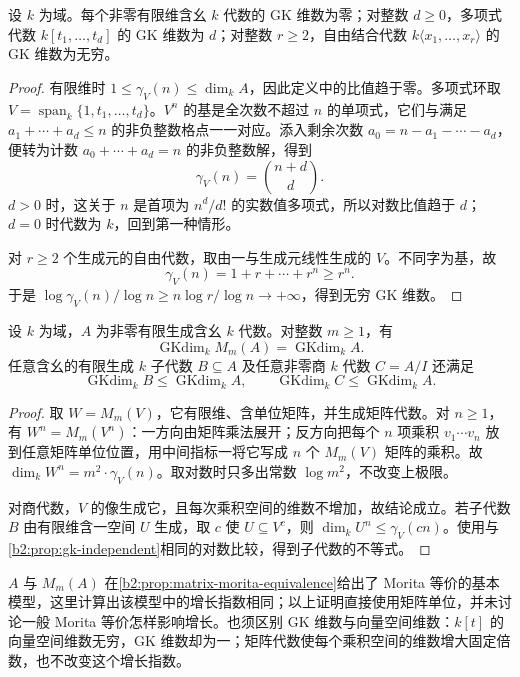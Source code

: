 \begin{proposition}\label{b2:prop:gk-basic-examples}
	设 \(k\) 为域。每个非零有限维含幺 \(k\) 代数的 GK 维数为零；对整数 \(d\geq0\)，多项式代数 \(k[t_1,\ldots,t_d]\) 的 GK 维数为 \(d\)；对整数 \(r\geq2\)，自由结合代数 \(k\langle x_1,\ldots,x_r\rangle\) 的 GK 维数为无穷。
\end{proposition}
\begin{proof}
	有限维时 \(1\le\gamma_V(n)\le\dim_kA\)，因此定义中的比值趋于零。多项式环取 \(V=\operatorname{span}_k\{1,t_1,\ldots,t_d\}\)。\(V^n\) 的基是全次数不超过 \(n\) 的单项式，它们与满足 \(a_1+\cdots+a_d\le n\) 的非负整数格点一一对应。添入剩余次数 \(a_0=n-a_1-\cdots-a_d\)，便转为计数 \(a_0+\cdots+a_d=n\) 的非负整数解，得到
	\[
		\gamma_V(n)=\binom{n+d}{d}.
	\]
	\(d>0\) 时，这关于 \(n\) 是首项为 \(n^d/d!\) 的实数值多项式，所以对数比值趋于 \(d\)；\(d=0\) 时代数为 \(k\)，回到第一种情形。

	对 \(r\ge2\) 个生成元的自由代数，取由一与生成元线性生成的 \(V\)。不同字为基，故
	\[
		\gamma_V(n)=1+r+\cdots+r^n\ge r^n.
	\]
	于是 \(\log\gamma_V(n)/\log n\ge n\log r/\log n\rightarrow+\infty\)，得到无穷 GK 维数。
\end{proof}

\begin{proposition}\label{b2:prop:gk-matrix-quotient}
	设 \(k\) 为域，\(A\) 为非零有限生成含幺 \(k\) 代数。对整数 \(m\geq1\)，有
	\[
		\operatorname{GKdim}_k M_m(A)=\operatorname{GKdim}_kA.
	\]
	任意含幺的有限生成 \(k\) 子代数 \(B\subseteq A\) 及任意非零商 \(k\) 代数 \(C=A/I\) 还满足
	\[
		\operatorname{GKdim}_kB\leq\operatorname{GKdim}_kA,\qquad \operatorname{GKdim}_kC\leq\operatorname{GKdim}_kA.
	\]
\end{proposition}
\begin{proof}
	取 \(W=M_m(V)\)，它有限维、含单位矩阵，并生成矩阵代数。对 \(n\ge1\)，有 \(W^n=M_m(V^n)\)：一方向由矩阵乘法展开；反方向把每个 \(n\) 项乘积 \(v_1\cdots v_n\) 放到任意矩阵单位位置，用中间指标一将它写成 \(n\) 个 \(M_m(V)\) 矩阵的乘积。故 \(\dim_kW^n=m^2\cdot\gamma_V(n)\)。取对数时只多出常数 \(\log m^2\)，不改变上极限。

	对商代数，\(V\) 的像生成它，且每次乘积空间的维数不增加，故结论成立。若子代数 \(B\) 由有限维含一空间 \(U\) 生成，取 \(c\) 使 \(U\subseteq V^c\)，则 \(\dim_kU^n\le\gamma_V(cn)\)。使用与\cref{b2:prop:gk-independent}相同的对数比较，得到子代数的不等式。
\end{proof}

\(A\) 与 \(M_m(A)\) 在\cref{b2:prop:matrix-morita-equivalence}给出了 Morita 等价的基本模型，这里计算出该模型中的增长指数相同；以上证明直接使用矩阵单位，并未讨论一般 Morita 等价怎样影响增长。也须区别 GK 维数与向量空间维数：\(k[t]\) 的向量空间维数无穷，GK 维数却为一；矩阵代数使每个乘积空间的维数增大固定倍数，也不改变这个增长指数。

